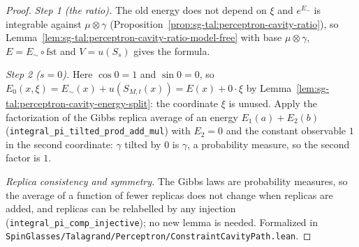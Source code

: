\begin{proof}
  \leanok
\emph{Step 1 (the ratio).} The old energy does not depend on $\xi$ and $e^{E_\sim}$ is integrable against $\mu\otimes\gamma$ (Proposition~\ref{prop:sg-tal:perceptron-cavity-ratio}),
so Lemma~\ref{lem:sg-tal:perceptron-cavity-ratio-model-free} with base $\mu\otimes\gamma$, $E=E_\sim\circ\mathrm{fst}$ and $V=u(S_s)$ gives the formula.

\emph{Step 2 ($s=0$).} Here $\cos 0=1$ and $\sin0=0$, so $E_0(x,\xi)=E_\sim(x)+u(S_{M,t}(x))=E(x)+0\cdot\xi$ by Lemma~\ref{lem:sg-tal:perceptron-cavity-energy-split}: the
coordinate $\xi$ is unused. Apply the factorization of the Gibbs replica average of an energy $E_1(a)+E_2(b)$ (\texttt{integral\_pi\_tilted\_prod\_add\_mul}) with
$E_2=0$ and the constant observable $1$ in the second coordinate: $\gamma$ tilted by $0$ is $\gamma$, a probability measure, so the second factor is $1$.

\emph{Replica consistency and symmetry.} The Gibbs laws are probability measures, so the average of a function of fewer replicas does not change
when replicas are added, and replicas can be relabelled by any injection (\texttt{integral\_pi\_comp\_injective}); no new lemma is needed.
Formalized in \texttt{SpinGlasses/Talagrand/Perceptron/ConstraintCavityPath.lean}.
\end{proof}

